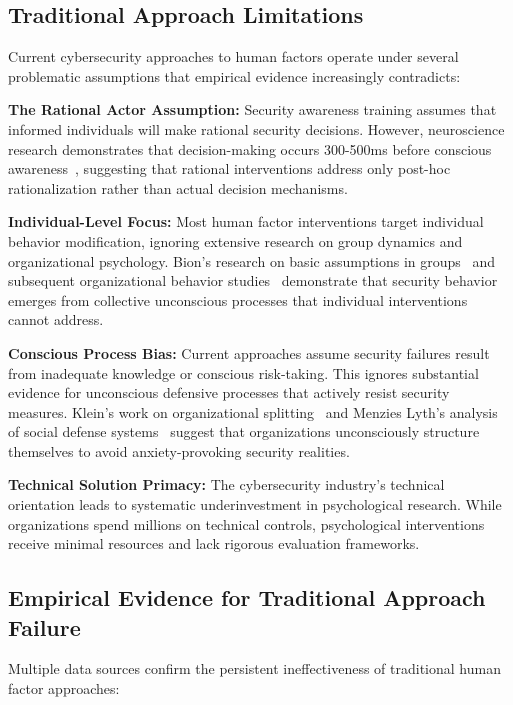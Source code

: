 \documentclass[11pt,a4paper]{article}
\begin{document}
\subsection{Traditional Approach Limitations}

Current cybersecurity approaches to human factors operate under several problematic assumptions that empirical evidence increasingly contradicts:

\textbf{The Rational Actor Assumption:} Security awareness training assumes that informed individuals will make rational security decisions. However, neuroscience research demonstrates that decision-making occurs 300-500ms before conscious awareness~\cite{libet1983,soon2008}, suggesting that rational interventions address only post-hoc rationalization rather than actual decision mechanisms.

\textbf{Individual-Level Focus:} Most human factor interventions target individual behavior modification, ignoring extensive research on group dynamics and organizational psychology. Bion's research on basic assumptions in groups~\cite{bion1961} and subsequent organizational behavior studies~\cite{kernberg1998} demonstrate that security behavior emerges from collective unconscious processes that individual interventions cannot address.

\textbf{Conscious Process Bias:} Current approaches assume security failures result from inadequate knowledge or conscious risk-taking. This ignores substantial evidence for unconscious defensive processes that actively resist security measures. Klein's work on organizational splitting~\cite{klein1946} and Menzies Lyth's analysis of social defense systems~\cite{menzies1960} suggest that organizations unconsciously structure themselves to avoid anxiety-provoking security realities.

\textbf{Technical Solution Primacy:} The cybersecurity industry's technical orientation leads to systematic underinvestment in psychological research. While organizations spend millions on technical controls, psychological interventions receive minimal resources and lack rigorous evaluation frameworks.

\subsection{Empirical Evidence for Traditional Approach Failure}

Multiple data sources confirm the persistent ineffectiveness of traditional human factor approaches:
\end{document}
